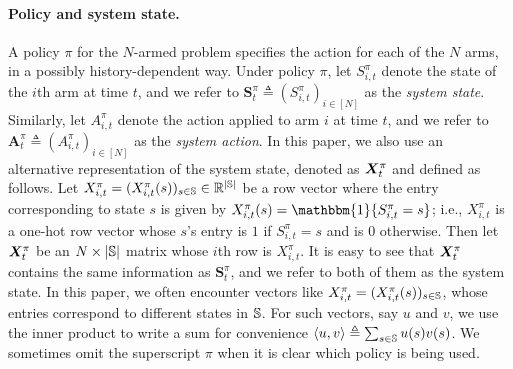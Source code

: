 \documentclass[11pt,letterpaper]{article}
\begin{document}
\paragraph{Policy and system state.}
A policy $\pi$ for the $N$-armed problem specifies the action for each of the $N$ arms, in a possibly history-dependent way.
Under policy $\pi$, let $S_{i,t}^\pi$ denote the state of the $i$th arm at time $t$, and we refer to $\bm{S}^\pi_t \triangleq (S_{i,t}^\pi)_{i\in[N]}$ as the \emph{system state}. Similarly,
let $A_{i,t}^\pi$ denote the action applied to arm $i$ at time $t$, and we refer to $\bm{A}^\pi_t \triangleq (A_{i,t}^\pi)_{i\in[N]}$ as the \emph{system action}. 
In this paper, we also use an alternative representation of the system state, denoted as ${\bm{X}}_t^\pi$ and defined as follows.
Let $X_{i,t}^\pi=(X_{i,t}^\pi(s))_{s\in\mathbb{S}}\in\mathbb{R}^{|\mathbb{S}|}$ be a row vector where the entry corresponding to state $s$ is given by $X_{i,t}^{\pi}(s)=\mathbbm{1}\{S_{i,t}^\pi=s\}$; i.e., $X_{i,t}^\pi$ is a one-hot row vector whose $s$'s entry is $1$ if $S_{i,t}^\pi=s$ and is $0$ otherwise.
Then let ${\bm{X}}_t^\pi$ be an $N\times|\mathbb{S}|$ matrix whose $i$th row is $X_{i,t}^\pi$.
It is easy to see that ${\bm{X}}_t^\pi$ contains the same information as $\bm{S}^\pi_t$, and we refer to both of them as the system state.
In this paper, we often encounter vectors like $X_{i,t}^\pi=(X_{i,t}^\pi(s))_{s\in\mathbb{S}}$, whose entries correspond to different states in $\mathbb{S}$.
For such vectors, say $u$ and $v$, we use the inner product to write a sum for convenience $\left\langle u, v \right\rangle\triangleq \sum_{s\in\mathbb{S}}u(s)v(s)$.
We sometimes omit the superscript $\pi$ when it is clear which policy is being used.
\end{document}
